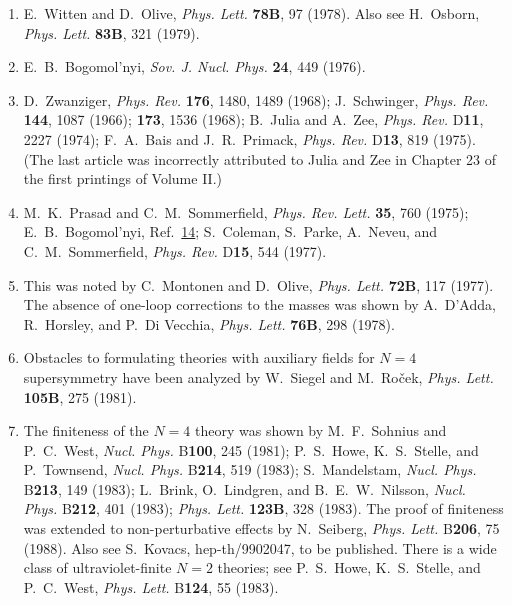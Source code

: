 \begin{enumerate}
  \item {}\label{ch27-ref-13}
  E.~Witten and D.~Olive, \textit{Phys. Lett.} \textbf{78B}, 97 (1978).
  Also see H.~Osborn, \textit{Phys. Lett.} \textbf{83B}, 321 (1979).

  \item {}\label{ch27-ref-14}
  E.~B.~Bogomol'nyi, \textit{Sov. J. Nucl. Phys.} \textbf{24}, 449
  (1976).

  \item {}\label{ch27-ref-15}
  D.~Zwanziger, \textit{Phys. Rev.} \textbf{176}, 1480, 1489 (1968);
  J.~Schwinger, \textit{Phys. Rev.} \textbf{144}, 1087 (1966);
  \textbf{173}, 1536 (1968); B.~Julia and A.~Zee,
  \textit{Phys. Rev.} D\textbf{11}, 2227 (1974); F.~A.~Bais and
  J.~R.~Primack, \textit{Phys. Rev.} D\textbf{13}, 819 (1975). (The
  last article was incorrectly attributed to Julia and Zee in Chapter
  23 of the first printings of Volume II.)

  \item {}\label{ch27-ref-16}
  M.~K.~Prasad and C.~M.~Sommerfield, \textit{Phys. Rev. Lett.}
  \textbf{35}, 760 (1975); E.~B.~Bogomol'nyi,
  Ref.~\hyperref[ch27-ref-14]{14}; S.~Coleman, S.~Parke, A.~Neveu, and
  C.~M.~Sommerfield, \textit{Phys. Rev.} D\textbf{15}, 544 (1977).

  \item {}\label{ch27-ref-17}
  This was noted by C.~Montonen and D.~Olive, \textit{Phys. Lett.}
  \textbf{72B}, 117 (1977). The absence of one-loop corrections to the
  masses was shown by A.~D'Adda, R.~Horsley, and P.~Di Vecchia,
  \textit{Phys. Lett.} \textbf{76B}, 298 (1978).

  \item {}\label{ch27-ref-18}
  Obstacles to formulating theories with auxiliary fields for $N=4$
  supersymmetry have been analyzed by W.~Siegel and M.~Ro\v{c}ek,
  \textit{Phys. Lett.} \textbf{105B}, 275 (1981).

  \item {}\label{ch27-ref-19}
  The finiteness of the $N=4$ theory was shown by M.~F.~Sohnius and
  P.~C.~West, \textit{Nucl. Phys.} B\textbf{100}, 245 (1981);
  P.~S.~Howe, K.~S.~Stelle, and P.~Townsend, \textit{Nucl. Phys.}
  B\textbf{214}, 519 (1983); S.~Mandelstam, \textit{Nucl. Phys.}
  B\textbf{213}, 149 (1983); L.~Brink, O.~Lindgren, and
  B.~E.~W.~Nilsson, \textit{Nucl. Phys.} B\textbf{212}, 401 (1983);
  \textit{Phys. Lett.} \textbf{123B}, 328 (1983). The proof of
  finiteness was extended to non-perturbative effects by N.~Seiberg,
  \textit{Phys. Lett.} B\textbf{206}, 75 (1988). Also see S.~Kovacs,
  hep-th/9902047, to be published. There is a wide class of
  ultraviolet-finite $N=2$ theories; see P.~S.~Howe, K.~S.~Stelle, and
  P.~C.~West, \textit{Phys. Lett.} B\textbf{124}, 55 (1983).


\end{enumerate}
